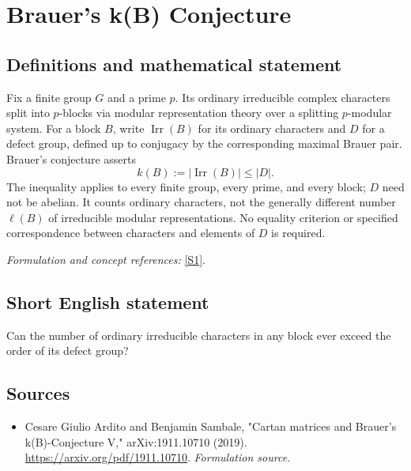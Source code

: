 \documentclass[11pt]{article}
\begin{document}
\section*{\texorpdfstring{Brauer's k(B) Conjecture}{Brauer's k(B) Conjecture}}\label{statement}
\subsection{Definitions and mathematical statement}
Fix a finite group $G$ and a prime $p$. Its ordinary irreducible complex characters split into $p$-blocks via modular representation theory over a splitting $p$-modular system. For a block $B$, write $\operatorname{Irr}(B)$ for its ordinary characters and $D$ for a defect group, defined up to conjugacy by the corresponding maximal Brauer pair. Brauer's conjecture asserts
\[
 k(B):=|\operatorname{Irr}(B)|\le |D|.
\]
The inequality applies to every finite group, every prime, and every block; $D$ need not be abelian. It counts ordinary characters, not the generally different number $\ell(B)$ of irreducible modular representations. No equality criterion or specified correspondence between characters and elements of $D$ is required.
\par\smallskip\textit{Formulation and concept references:} \href{https://arxiv.org/pdf/1911.10710}{[S1]}.

\subsection{Short English statement}
Can the number of ordinary irreducible characters in any block ever exceed the order of its defect group?
\subsection{Sources}
\begin{itemize}
\item[S1]Cesare Giulio Ardito and Benjamin Sambale, "Cartan matrices and Brauer's k(B)-Conjecture V," arXiv:1911.10710 (2019).
\url{https://arxiv.org/pdf/1911.10710}.
\textit{Formulation source.}
\end{itemize}
\end{document}
